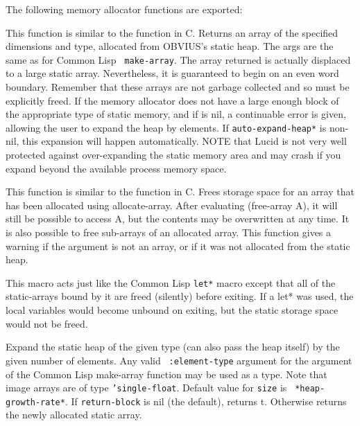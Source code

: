 The following memory allocator functions are exported:
\begin{description}

\item{}
This function is similar to the  function in C.  Returns
an array of the specified dimensions and type, allocated from OBVIUS's
static heap.  The args are the same as for Common Lisp {\tt
make-array}.  The array returned is actually displaced to a large
static array.  Nevertheless, it is guaranteed to begin on an even word
boundary.  Remember that these arrays are not garbage collected and so
must be explicitly freed.  If the memory allocator does not have a
large enough block of the appropriate type of static memory, and if
 is nil, a continuable error is given,
allowing the user to expand the heap by 
elements.  If {\tt *auto-expand-heap*} is non-nil, this expansion will
happen automatically.  NOTE that Lucid is not very well protected
against over-expanding the static memory area and may crash if you
expand beyond the available process memory space.

\item{}
This function is similar to the  function in C.  Frees
storage space for an array that has been allocated using
allocate-array.  After evaluating (free-array A), it will still be
possible to access A, but the contents may be overwritten at any time.
It is also possible to free sub-arrays of an allocated array.  This
function gives a warning if the argument is not an array, or if it was
not allocated from the static heap.

\item{}
This macro acts just like the Common Lisp {\tt let*} macro except that
all of the static-arrays bound by it are freed (silently) before
exiting.  If a let* was used, the local variables would become unbound
on exiting, but the static storage space would not be freed.

\item{}
Expand the static heap of the given type (can also pass the heap
itself) by the given number of elements.  Any valid {\tt
:element-type} argument for the argument of the Common Lisp make-array
function may be used as a type.  Note that image arrays are of type
{\tt 'single-float}.  Default value for {\tt size} is {\tt
*heap-growth-rate*}.  If {\tt return-block} is nil (the default),
returns t.  Otherwise returns the newly allocated static array.


\end{description}

